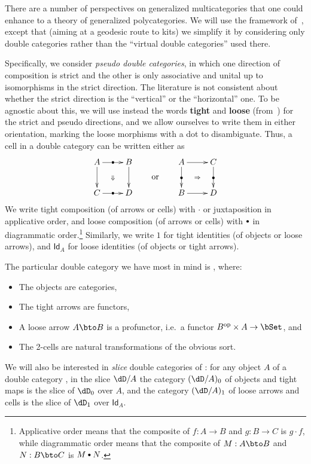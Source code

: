 \documentclass{amsart}
\let\tc\cdot
\newcommand{\bc}{\mathbin{\raisebox{1pt}{\scriptsize$\bullet$}}}
\newcommand{\hunit}[1]{\Id_{#1}}
\newcommand{\Id}{\mathsf{Id}}
\begin{document}
There are a number of perspectives on generalized multicategories that one could enhance to a theory of generalized polycategories.
We will use the framework of~\cite{cs:multicats}, except that (aiming at a geodesic route to kits) we simplify it by considering only double categories rather than the ``virtual double categories'' used there.

Specifically, we consider \emph{pseudo double categories}, in which one direction of composition is strict and the other is only associative and unital up to isomorphisms in the strict direction.
The literature is not consistent about whether the strict direction is the ``vertical'' or the ``horizontal'' one.
To be agnostic about this, we will use instead the words \textbf{tight} and \textbf{loose} (from~\cite{ls:limlax}) for the strict and pseudo directions, and we allow ourselves to write them in either orientation, marking the loose morphisms with a dot to disambiguate.
Thus, a cell in a double category can be written either as
\[ \vcenter{\xymatrix{ A \ar[r]|{\bullet} \ar[d] \ar@{}[dr]|{\Downarrow}& B \ar[d] \\ C \ar[r]|{\bullet} & D } }
\qquad\text{or}\qquad
\vcenter{\xymatrix{ A \ar[d]|{\bullet} \ar[r] \ar@{}[dr]|{\Rightarrow}& C \ar[d]|{\bullet} \\ B \ar[r] & D } }
\]
We write tight composition (of arrows or cells) with $\tc$ or juxtaposition in applicative order, and loose composition (of arrows or cells) with $\bc$ in diagrammatic order.\footnote{Applicative order means that the composite of $f:A\to B$ and $g:B\to C$ is $g\tc f$, while diagrammatic order means that the composite of $M:A\bto B$ and $N:B\bto C$ is $M\bc N$.}
Similarly, we write $1$ for tight identities (of objects or loose arrows), and $\hunit{A}$ for loose identities (of objects or tight arrows).

The particular double category we have most in mind is \dCat, where:
\begin{itemize}
\item The objects are categories,
\item The tight arrows are functors,
\item A loose arrow $A\bto B$ is a profunctor, i.e.\ a functor $B\op\times A\to\bSet$, and
\item The 2-cells are natural transformations of the obvious sort.
\end{itemize}
We will also be interested in \emph{slice} double categories of \dCat: for any object $A$ of a double category \dD, in the slice $\dD/A$ the category $(\dD/A)_0$ of objects and tight maps is the slice of $\dD_0$ over $A$, and the category $(\dD/A)_1$ of loose arrows and cells is the slice of $\dD_1$ over $\hunit A$.
\end{document}
